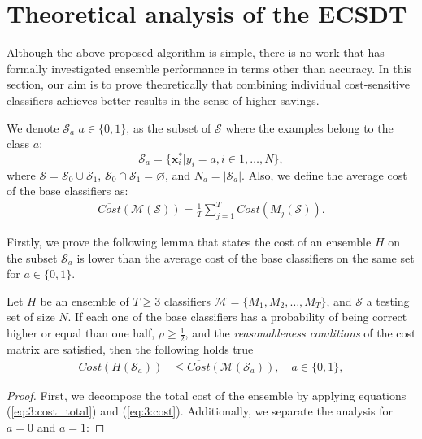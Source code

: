 {\newpage 
\section{Theoretical analysis of the ECSDT}
\label{sec:9:theoretical}

  Although the above proposed algorithm is simple, there is %
  no work that has formally 
  investigated ensemble performance in terms other than accuracy. In this section, our aim is to 
  prove theoretically that combining individual cost-sensitive classifiers achieves better results 
  in the sense of higher savings.
  
  We denote $\mathcal{S}_a$ $a\in \{0,1\}$, as the subset of $\mathcal{S}$ 
  where the examples belong to the class $a$:
  \begin{equation}\label{eq:9:S_a}
    \mathcal{S}_a = \{\mathbf{x}_i^* \vert y_i = a, i \in 1,\dots,N\},
  \end{equation}
  where $\mathcal{S}=\mathcal{S}_0 \cup \mathcal{S}_1$, $\mathcal{S}_0 \cap \mathcal{S}_1 = 
  \varnothing$, and $N_a=\vert \mathcal{S}_a \vert$. Also, we define the average cost of the base 
  classifiers as:
  \begin{align}\label{eq:9:avg_cost}
    \overline{Cost} (\mathcal{M}(\mathcal{S}))= \frac{1}{T} \sum_{j=1}^{T} Cost(M_j(\mathcal{S})). 
  \end{align}
  
  \noindent Firstly, we prove the following lemma that states the cost of an ensemble $H$ on the 
  subset $\mathcal{S}_a$ is lower than the average cost of the base classifiers on the same set for 
  $a  \in \{0,1\}$.

  \begin{lemma}\label{lemma1}
  Let $H$ be an ensemble of $T\ge3$ classifiers $\mathcal{M}=\{M_1, M_2,\dots,M_T\}$, and 
  $\mathcal{S}$ a testing set of size $N$. If each one of the base classifiers has a probability 
  of being correct higher or equal than one half, $\rho \ge \frac{1}{2}$, and the 
  \textit{reasonableness conditions} of the cost matrix are satisfied, then the following holds true
  \begin{align}\label{eq:9:lemma}
    Cost(H(\mathcal{S}_a)) &\le \overline{Cost} (\mathcal{M}(\mathcal{S}_a)) , \quad a  \in\{0,1\},  
 \end{align}
  \end{lemma}
  
  \noindent\begin{proof}
  First, we decompose the total cost of the ensemble by applying equations (\ref{eq:3:cost_total}) 
  and (\ref{eq:3:cost}). Additionally, we separate the analysis for $a=0$ and $a=1$:


\end{proof}}

